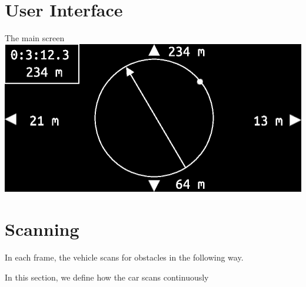 \documentclass[11pt]{article}
\begin{document}
\section{User Interface}
The main screen 
\includegraphics{screen.eps}

\section{Scanning}
\label{sec:scanning}

In each frame, the vehicle scans for obstacles in the following way.

In this section, we define how the car scans continuously 
\end{document}
